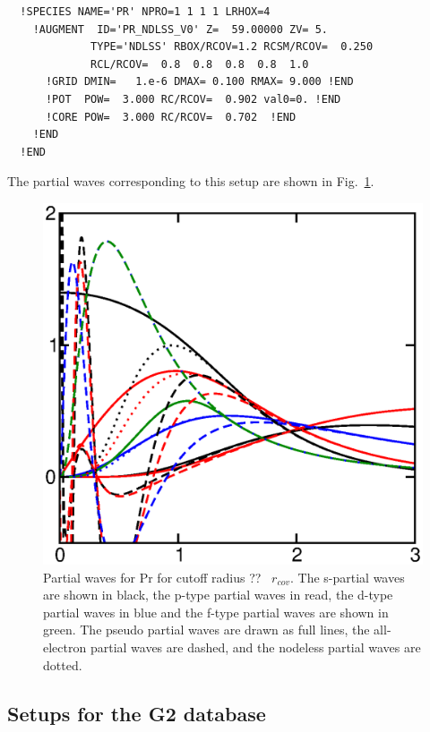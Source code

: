 \documentclass[11pt,a4paper]{report}
\begin{document}
\begin{verbatim}
  !SPECIES NAME='PR' NPRO=1 1 1 1 LRHOX=4
    !AUGMENT  ID='PR_NDLSS_V0' Z=  59.00000 ZV= 5.
             TYPE='NDLSS' RBOX/RCOV=1.2 RCSM/RCOV=  0.250
             RCL/RCOV=  0.8  0.8  0.8  0.8  1.0
      !GRID DMIN=   1.e-6 DMAX= 0.100 RMAX= 9.000 !END
      !POT  POW=  3.000 RC/RCOV=  0.902 val0=0. !END
      !CORE POW=  3.000 RC/RCOV=  0.702  !END
    !END
  !END
\end{verbatim}
The partial waves corresponding to this setup are shown in
Fig.~\ref{fig:prpartialwaves}.
\begin{figure}[!h]
\begin{center}
\includegraphics[width=0.8\linewidth]{Figs/Pr_setuptest/prpartialwaves.eps}
\end{center}
\caption{\label{fig:prpartialwaves} Partial waves for Pr for cutoff
  radius ??~ $r_{cov}$.  The s-partial waves are shown in black, the
  p-type partial waves in read, the d-type partial waves 
  in blue and the f-type partial waves are shown
  in green. The pseudo partial waves are drawn as full lines, the
  all-electron partial waves are dashed, and the nodeless partial
  waves are dotted.}
\end{figure}


\subsection{Setups for the G2 database}
\end{document}
